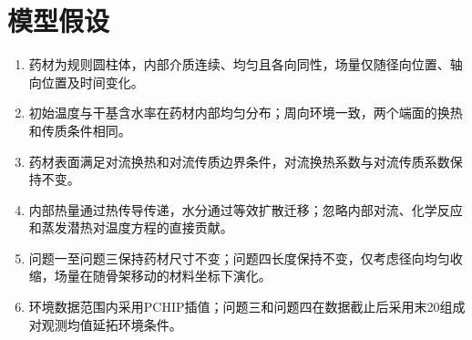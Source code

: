 \section{模型假设}
\begin{enumerate}[label=\arabic*.]
\item 药材为规则圆柱体，内部介质连续、均匀且各向同性，场量仅随径向位置、轴向位置及时间变化。
\item 初始温度与干基含水率在药材内部均匀分布；周向环境一致，两个端面的换热和传质条件相同。
\item 药材表面满足对流换热和对流传质边界条件，对流换热系数与对流传质系数保持不变。
\item 内部热量通过热传导传递，水分通过等效扩散迁移；忽略内部对流、化学反应和蒸发潜热对温度方程的直接贡献。
\item 问题一至问题三保持药材尺寸不变；问题四长度保持不变，仅考虑径向均匀收缩，场量在随骨架移动的材料坐标下演化。
\item 环境数据范围内采用PCHIP插值；问题三和问题四在数据截止后采用末20组成对观测均值延拓环境条件。
\end{enumerate}
